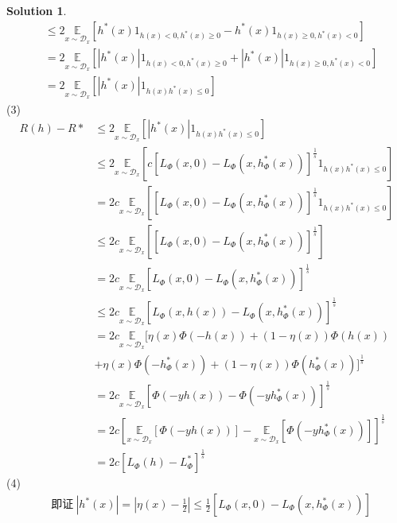 \documentclass[a4paper,UTF8]{article}
\theoremstyle{definition}
\newtheorem*{solution}{Solution}
\begin{document}
\begin{solution}
\begin{equation*}
\begin{split}
		&\le 2\underset{x \sim \mathcal{D}_{x}}{\mathbb{E}}\left[h^{*}(x)1_{h(x)<0,h^*(x)\ge 0} - h^*(x)1_{h(x)\ge 0,h^*(x)<0}\right]\\
		&=2\underset{x \sim \mathcal{D}_{x}}{\mathbb{E}}\left[|h^{*}(x)|1_{h(x)<0,h^*(x)\ge 0} +|h^*(x)|1_{h(x)\ge 0,h^*(x)<0}\right]\\
		&=2 \underset{x \sim \mathcal{D}_{x}}{\mathbb{E}}\left[\left|h^{*}(x)\right| 1_{h(x) h^{*}(x) \leq 0}\right]
	\end{split}
\end{equation*}
(3)
\begin{equation*}
	\begin{split}
		R(h)-R* &\le 2 \underset{x \sim \mathcal{D}_{x}}{\mathbb{E}}\left[\left|h^{*}(x)\right| 1_{h(x) h^{*}(x) \leq 0}\right]\\
		&\le 2 \underset{x \sim \mathcal{D}_{x}}{\mathbb{E}}\left[c [L_\Phi(x,0)-L_\Phi(x,h^*_\Phi(x))]^\frac{1}{s} 1_{h(x) h^{*}(x) \leq 0}\right]\\
		&= 2c \underset{x \sim \mathcal{D}_{x}}{\mathbb{E}}\left[[L_\Phi(x,0)-L_\Phi(x,h^*_\Phi(x))]^\frac{1}{s} 1_{h(x) h^{*}(x) \leq 0}\right]\\
		&\le 2c \underset{x \sim \mathcal{D}_{x}}{\mathbb{E}}\left[[L_\Phi(x,0)-L_\Phi(x,h^*_\Phi(x))]^\frac{1}{s}\right]\\
		&=2c \underset{x \sim \mathcal{D}_{x}}{\mathbb{E}}[L_\Phi(x,0)-L_\Phi(x,h^*_\Phi(x))]^\frac{1}{s}\\
		&\le 2c \underset{x \sim \mathcal{D}_{x}}{\mathbb{E}}[L_\Phi(x,h(x))-L_\Phi(x,h^*_\Phi(x))]^\frac{1}{s}\\
		&=2c \underset{x \sim \mathcal{D}_{x}}{\mathbb{E}}[\eta(x)\Phi(-h(x))+(1-\eta(x))\Phi(h(x))\\
		&+\eta(x)\Phi(-h^*_\Phi(x))+(1-\eta(x))\Phi(h^*_\Phi(x))]^\frac{1}{s}\\
		&=2c \underset{x \sim \mathcal{D}_{x}}{\mathbb{E}}[\Phi(-yh(x))-\Phi(-yh^*_\Phi(x))]^\frac{1}{s}\\
		&=2c [\underset{x \sim \mathcal{D}_{x}}{\mathbb{E}}[\Phi(-yh(x))]-\underset{x \sim \mathcal{D}_{x}}{\mathbb{E}}[\Phi(-yh^*_\Phi(x))]]^\frac{1}{s}\\
		&=2c [L_\Phi(h)-L^*_\Phi]^\frac{1}{s}
	\end{split}
\end{equation*}
(4)
\begin{equation*}
	\begin{split}
		&\text{即证}\ |h^*(x)| = |\eta(x)-\frac{1}{2}| \le \frac{1}{2}[L_\Phi(x,0)-L_\Phi(x,h^*_\Phi(x))]\\

\end{split}
\end{equation*}
\end{solution}
\end{document}
